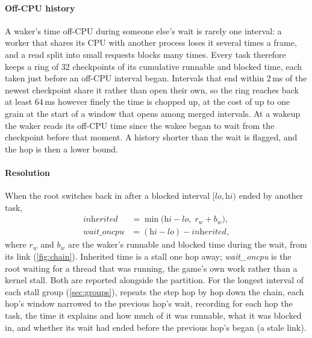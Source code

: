\paragraph{Off-CPU history} A waker's time off-CPU during someone else's wait is
rarely one interval: a worker that shares its CPU with another process loses
it several times a frame, and a read split into small requests blocks many
times. Every task therefore keeps a ring of 32 checkpoints of its
cumulative runnable and blocked time, each taken just before an off-CPU
interval began. Intervals that end within 2\,ms of the newest checkpoint
share it rather than open their own, so the ring reaches back at least
64\,ms however finely the time is chopped up, at the cost of up to one grain
at the start of a window that opens among merged intervals. At a wakeup the
waker reads its off-CPU time since the wakee began to wait from the
checkpoint before that moment. A history shorter than the wait is flagged,
and the hop is then a lower bound.

\paragraph{Resolution} When the root switches back in after a blocked interval
$[\textit{lo}, \textit{hi})$ ended by another task,
\begin{align*}
\textit{inherited} &= \min\bigl(\textit{hi} - \textit{lo},\; r_w + b_w\bigr),\\
\textit{wait\_oncpu} &= (\textit{hi} - \textit{lo}) - \textit{inherited},
\end{align*}
where $r_w$ and $b_w$ are the waker's runnable and blocked time during the
wait, from its link (\autoref{fig:chain}). Inherited time is a stall
one hop away; \textit{wait\_oncpu} is the root waiting for a thread that was
running, the game's own work rather than a kernel stall. Both are reported
alongside the partition. For the longest interval of each stall group
(\autoref{sec:groups}), \sys repeats the step hop by hop down the chain, each
hop's window narrowed to the previous hop's wait, recording for each hop the
task, the time it explains and how much of it was runnable, what it was
blocked in, and whether its wait had ended before the previous hop's began
(a stale link).

